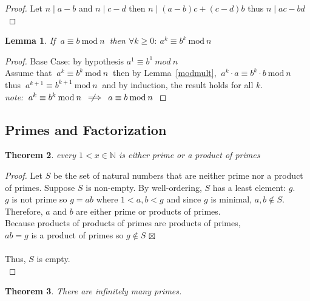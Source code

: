 \documentclass[12pt]{extarticle}
\newcommand{\notimplies}{%
  \mathrel{{\ooalign{\hidewidth$\not\phantom{=}$\hidewidth\cr$\implies$}}}}
\renewcommand\qedsymbol{$\square$}
\newcommand{\cont}{$\boxtimes$}
\newcommand{\divides}{\mid}
\newcommand{\N}{\mathbb{N}}
\newtheorem{theorem}{Theorem}[section]
\newtheorem{lemma}[theorem]{Lemma}
\newenvironment{lproof}{\begin{proof} \renewcommand{\qedsymbol}{}}{\end{proof}}
\renewcommand{\mod}[3]{\: #1 \equiv #2 \: \mathrm{mod} \: #3 \:}
\begin{document}
\begin{lproof}
Let $n \divides a-b$ and $n \divides c-d$ then $n \divides (a-b)c + (c-d)b$ thus $n \divides ac -bd$
\end{lproof}

\begin{lemma}
\label{modpower}
If $\mod{a}{b}{n}$ then $\forall k \geq 0: \mod{a^k}{b^k}{n}$
\end{lemma}

\begin{lproof}
Base Case: by hypothesis $ a^1 \equiv b^1 \: mod \: n$\\
Assume that $\mod{a^k}{b^k}{n}$ then by Lemma~\ref{modmult}, $\mod{a^k \cdot a}{b^k   \cdot b}{n}$\\ thus $\mod{a^{k+1}} {b^{k+1}}{n}$ and by induction, the result holds for all $k$.\\
\textit{note:} $\mod{a^k}{b^k}{n} \notimplies \mod{a}{b}{n}$
\end{lproof}



\subsection{Primes and Factorization}

\begin{theorem}
\label{primeorprod}
every $1 < x \in \N$ is either prime or a product of primes
\end{theorem}

\begin{proof}
Let $S$ be the set of natural numbers that are neither prime nor a product of primes. Suppose $S$ is non-empty. By well-ordering, $S$ has a least element: $g$.\\
$g$ is not prime so $g = ab$ where $1 < a,b < g$ and since $g$ is minimal, $a,b \notin S$.\\
Therefore, $a$ and $b$ are either prime or products of primes. \\
Because products of products of primes are products of primes, \\
$ab = g$ is a product of primes so $g \notin S$ \cont \\\\
Thus, $S$ is empty.\\
\end{proof}

\begin{theorem}
There are infinitely many primes.
\end{theorem}
\end{document}

